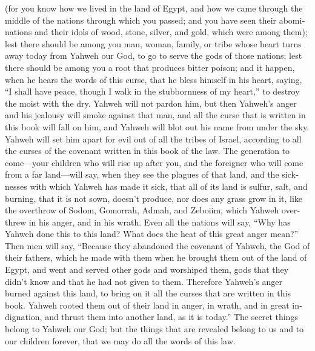 \begin{paracol}{2}
\begin{otherlanguage}{english}
 (for you know how we lived in the land of Egypt, and how
we came through the middle of the nations through which you passed;
 and you have seen their abominations and their idols of
wood, stone, silver, and gold, which were among them); 
lest there should be among you man, woman, family, or tribe whose heart
turns away today from Yahweh our God, to go to serve the gods of those
nations; lest there should be among you a root that produces bitter
poison;  and it happen, when he hears the words of this
curse, that he bless himself in his heart, saying, ``I shall have peace,
though I walk in the stubbornness of my heart,'' to destroy the moist
with the dry.  Yahweh will not pardon him, but then
Yahweh's anger and his jealousy will smoke against that man, and all the
curse that is written in this book will fall on him, and Yahweh will
blot out his name from under the sky.  Yahweh will set
him apart for evil out of all the tribes of Israel, according to all the
curses of the covenant written in this book of the law. 
The generation to come---your children who will rise up after you, and
the foreigner who will come from a far land---will say, when they see
the plagues of that land, and the sicknesses with which Yahweh has made
it sick,  that all of its land is sulfur, salt, and
burning, that it is not sown, doesn't produce, nor does any grass grow
in it, like the overthrow of Sodom, Gomorrah, Admah, and Zeboiim, which
Yahweh overthrew in his anger, and in his wrath.  Even
all the nations will say, ``Why has Yahweh done this to this land? What
does the heat of this great anger mean?''  Then men will
say, ``Because they abandoned the covenant of Yahweh, the God of their
fathers, which he made with them when he brought them out of the land of
Egypt,  and went and served other gods and worshiped
them, gods that they didn't know and that he had not given to them.
 Therefore Yahweh's anger burned against this land, to
bring on it all the curses that are written in this book.
 Yahweh rooted them out of their land in anger, in wrath,
and in great indignation, and thrust them into another land, as it is
today.''  The secret things belong to Yahweh our God; but
the things that are revealed belong to us and to our children forever,
that we may do all the words of this law.

\end{otherlanguage}


\end{paracol}
